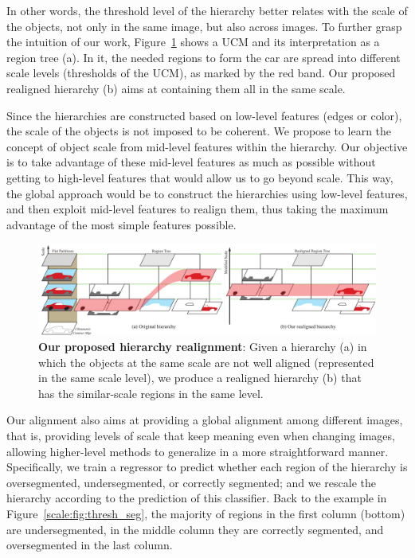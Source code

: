 In other words, the threshold level of the hierarchy better relates with the scale of the objects, not only
in the same image, but also across images.
To further grasp the intuition of our work, Figure~\ref{scale:fig:hier_align} shows a UCM and its interpretation as
a region tree (a).
In it, the needed regions to form the car are spread into different scale levels (thresholds of the UCM), as
marked by the red band.
Our proposed realigned hierarchy (b) aims at containing them all in the same scale.

Since the hierarchies are constructed based on low-level features (edges or color), the scale of the objects
is not imposed to be coherent.
We propose to learn the concept of object scale from mid-level features within the hierarchy.
Our objective is to take advantage of these mid-level features as much as possible without getting to
high-level features that would allow us to go beyond scale.
This way, the global approach would be to construct the hierarchies using low-level features,
and then exploit mid-level features to realign them, thus taking the maximum advantage of the most simple 
features possible.

\begin{figure}
\begin{center}
\includegraphics[width=\textwidth]{scale-aware/fig/hierarchy.pdf}
\end{center}
\caption{\textbf{Our proposed hierarchy realignment}: Given a hierarchy (a) in which the objects at the same scale are not well aligned (represented in the same scale level), we produce a realigned hierarchy (b) that
has the similar-scale regions in the same level.}
\label{scale:fig:hier_align}
\end{figure}


Our alignment also aims at providing a global alignment among different images, that is, providing levels 
of scale that keep meaning even when changing images, allowing higher-level methods to generalize in a more straightforward manner.
Specifically, we train a regressor to predict whether each region of the hierarchy is oversegmented, undersegmented, or correctly segmented; and we rescale the hierarchy according to the prediction 
of this classifier.
Back to the example in Figure~\ref{scale:fig:thresh_seg}, the majority of regions in the first column (bottom) 
are undersegmented, in the middle column they are correctly segmented, and oversegmented in the last column.


